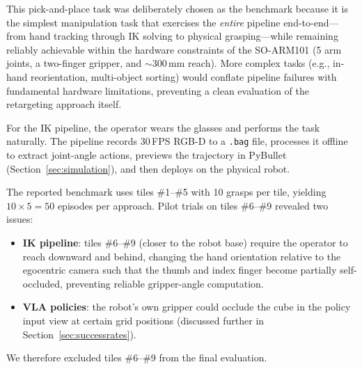 \documentclass{ieeeaccess}
\begin{document}
This pick-and-place task was deliberately chosen as the benchmark
because it is the simplest manipulation task that exercises the
\emph{entire} pipeline end-to-end---from hand tracking through IK
solving to physical grasping---while remaining reliably achievable
within the hardware constraints of the SO-ARM101 (5 arm joints,
a two-finger gripper, and ${\sim}$300\,mm reach). More complex tasks
(e.g., in-hand reorientation, multi-object sorting) would conflate
pipeline failures with fundamental hardware limitations, preventing
a clean evaluation of the retargeting approach itself.

For the IK pipeline, the operator wears the glasses and
performs the task naturally. The pipeline records 30\,FPS RGB-D to a
\texttt{.bag} file, processes it offline to extract joint-angle actions,
previews the trajectory in PyBullet (Section~\ref{sec:simulation}),
and then deploys on the physical robot.

The reported benchmark uses tiles \#1--\#5 with 10 grasps per tile,
yielding $10 \times 5 = 50$ episodes per approach. Pilot trials on
tiles \#6--\#9 revealed two issues:
\begin{itemize}
  \item \textbf{IK pipeline}: tiles \#6--\#9 (closer to the robot base)
        require the operator to reach downward and behind, changing
        the hand orientation relative to the egocentric camera such
        that the thumb and index finger become partially self-occluded,
        preventing reliable gripper-angle computation.
  \item \textbf{VLA policies}: the robot's own gripper could occlude the
        cube in the policy input view at certain grid positions
        (discussed further in Section~\ref{sec:successrates}).
\end{itemize}
We therefore excluded tiles \#6--\#9 from the final evaluation.
\end{document}
